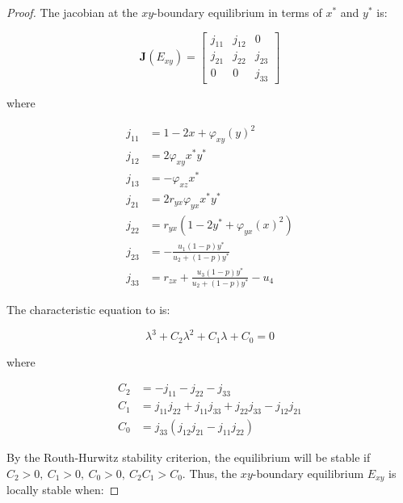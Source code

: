 \begin{proof}
    The jacobian at the $xy$-boundary equilibrium in terms of $x^*$ and $y^*$ is:

    \begin{equation}\label{matrix:jacobian-boundary-xy}
        \textbf{J}\left(E_{xy}\right) = \begin{bmatrix}
            j_{11} & j_{12} & 0\\
            j_{21} & j_{22} & j_{23}\\
            0 & 0 & j_{33}
        \end{bmatrix}
    \end{equation}

    where
    
    \begin{align*}
        j_{11} &= 1-2x+\varphi_{xy}\left(y\right)^2\\
        j_{12} &= 2\varphi_{xy}x^*y^*\\
        j_{13} &= -\varphi_{xz}x^*\\
        j_{21} &= 2r_{yx}\varphi_{yx}x^*y^*\\
        j_{22} &= r_{yx}\left(1-2y^*+\varphi_{yx}\left(x\right)^2\right)\\
        j_{23} &= -\frac{u_1\left(1-p\right)y^*}{u_2+\left(1-p\right)y^*}\\
        j_{33} &= r_{zx}+\frac{u_3\left(1-p\right)y^*}{u_2+\left(1-p\right)y^*}-u_4
    \end{align*}

    The characteristic equation to  is:

    \begin{equation*}\label{eq:char-eq-xy}
        \lambda^3+C_2\lambda^2+C_1\lambda+C_0=0
    \end{equation*}

    where
    
    \begin{align*}
        C_2 &= -j_{11}-j_{22}-j_{33}\\
        C_1 &= j_{11}j_{22}+j_{11}j_{33}+j_{22}j_{33}-j_{12}j_{21}\\
        C_0 &= j_{33}\left(j_{12}j_{21}-j_{11}j_{22}\right)
    \end{align*}

    By the Routh-Hurwitz stability criterion, the equilibrium will be stable if $C_2>0,\ C_1>0,\ C_0>0,\ C_2C_1>C_0$. Thus, the $xy$-boundary equilibrium $E_{xy}$ is locally stable when:


\end{proof}
